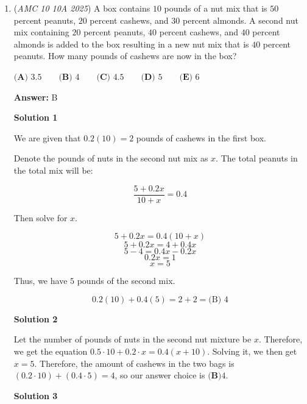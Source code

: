 \begin{enumerate}
 \( t = 3 \).

 \begin{verbatim}
\href{https://youtu.be/LN5ofIcs1kY}{https://youtu.be/LN5ofIcs1kY} 
\end{verbatim}

\begin{verbatim}
\href{https://youtu.be/c-UDo53KwFU}{https://youtu.be/c-UDo53KwFU}
\end{verbatim}

\textbf{Easy Solution} 


	\item (\textit{AMC 10 10A 2025}) A box contains $10$ pounds of a nut mix that is $50$ percent peanuts, $20$ percent cashews, and $30$ percent almonds. A second nut mix containing $20$ percent peanuts, $40$ percent cashews, and $40$ percent almonds is added to the box resulting in a new nut mix that is $40$ percent peanuts. How many pounds of cashews are now in the box? 


 $\textbf{(A) } 3.5 \qquad\textbf{(B) } 4 \qquad\textbf{(C) } 4.5 \qquad\textbf{(D) } 5 \qquad\textbf{(E) } 6$

 \textbf{Answer: }B



\textbf{Solution 1}

We are given that $0.2(10) = 2$ pounds of cashews in the first box.

 Denote the pounds of nuts in the second nut mix as $x.$ The total peanuts in the total mix will be:

 
 \[\frac{5 + 0.2x}{10 + x} = 0.4\]

 Then solve for $x.$

 \[5 + 0.2x = 0.4(10 + x)\]
 \[5 + 0.2x = 4 + 0.4x\]
 \[5 - 4 = 0.4x - 0.2x\]
 \[0.2x = 1\]
 \[x = 5\]

 Thus, we have $5$ pounds of the second mix. 

 
 \[0.2(10) + 0.4(5) = 2 + 2 = \boxed{\text{(B) }4}\]




\textbf{Solution 2}

Let the number of pounds of nuts in the second nut mixture be $x$. Therefore, we get the equation $0.5 \cdot 10 + 0.2 \cdot x = 0.4(x+10)$. Solving it, we then get $x=5$. Therefore, the amount of cashews in the two bags is $(0.2 \cdot 10) + (0.4 \cdot 5) = 4$, so our answer choice is $\boxed{\textbf{(B)} 4}$.

 



\textbf{Solution 3}


\end{enumerate}
